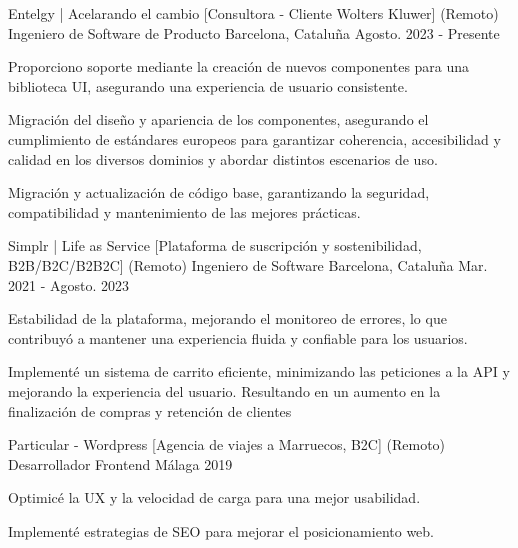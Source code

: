 
\begin{cventries}
    \cventry
    {Entelgy | Acelarando el cambio [Consultora - Cliente Wolters Kluwer] (Remoto)}
    {Ingeniero de Software de Producto}
    {Barcelona, Cataluña}
    {Agosto. 2023 - Presente}
    {
    \begin{cvitems}
        \item{Proporciono soporte mediante la creación de nuevos componentes para una biblioteca UI, asegurando una experiencia de usuario consistente.}         
        \item{Migración del diseño y apariencia de los componentes, asegurando el cumplimiento de estándares europeos para garantizar coherencia, accesibilidad y calidad en los diversos dominios y abordar distintos escenarios de uso.}         
        \item{Migración y actualización de código base, garantizando la seguridad, compatibilidad y mantenimiento de las mejores prácticas.}         
    \end{cvitems}
    }

    \cventry
    {Simplr | Life as Service [Plataforma de suscripción y sostenibilidad, B2B/B2C/B2B2C] (Remoto)}
    {Ingeniero de Software}
    {Barcelona, Cataluña}
    {Mar. 2021 - Agosto. 2023}
    {
    \begin{cvitems}
        \item{Estabilidad de la plataforma, mejorando el monitoreo de errores, lo que contribuyó a mantener una experiencia fluida y confiable para los usuarios.}
        \item{Implementé un sistema de carrito eficiente, minimizando las peticiones a la API y mejorando la experiencia del usuario. Resultando en un aumento en la finalización de compras y retención de clientes}
    \end{cvitems}
    }

    \cventry
    {Particular - Wordpress [Agencia de viajes a Marruecos, B2C] (Remoto)}
    {Desarrollador Frontend}
    {Málaga}
    {2019}
    {
    \begin{cvitems}
        \item{Optimicé la UX y la velocidad de carga para una mejor usabilidad.}
        \item{Implementé estrategias de SEO para mejorar el posicionamiento web.}
    \end{cvitems}
    }


\end{cventries}
